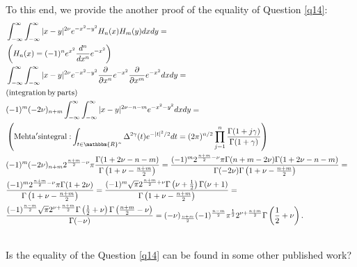 \documentclass{article}
\newcommand{\tmop}[1]{\ensuremath{\operatorname{#1}}}
\begin{document}
To this end, we provide the another proof of the equality of Question
\ref{q14}:
\begin{eqnarray}
  & \int_{- \infty}^{\infty} \int_{- \infty}^{\infty} | x - y |^{2 \nu} e^{-
  x^2 - y^2} H_n (x) H_m (y) d x d y = &  \nonumber\\
  & \left( H_n (x) = (- 1)^n e^{x^2} \frac{d^n}{d x^n} e^{- x^2} \right) & 
  \nonumber\\
  & \int_{- \infty}^{\infty} \int_{- \infty}^{\infty} | x - y |^{2 \nu} e^{-
  x^2 - y^2} \frac{\partial}{\partial x^n} e^{- x^2} \frac{\partial}{\partial
  x^m} e^{- x^2} d x d y = &  \nonumber\\
  & (\tmop{integration} \tmop{by} \tmop{parts}) &  \nonumber\\
  & (- 1)^m (- 2 \nu)_{n + m} \int_{- \infty}^{\infty} \int_{-
  \infty}^{\infty} | x - y |^{2 \nu - n - m} e^{- x^2 - y^2} d x d y = & 
  \nonumber\\
  & \left( \mathrm{Mehta's integral:} \int_{t \in \mathbbm{R}^n} \Delta^{2
  \gamma} (t) e^{- | t |^2 / 2} d t = (2 \pi)^{n / 2} \prod_{j = 1}^n
  \frac{\Gamma (1 + j \gamma)}{\Gamma (1 + \gamma)} \right) &  \nonumber\\
  & (- 1)^m (- 2 \nu)_{n + m} 2^{\frac{n + m}{2} - \nu} \pi \frac{\Gamma (1 +
  2 \nu - n - m)}{\Gamma \left( 1 + \nu - \frac{n + m}{2} \right)} = \frac{(-
  1)^m 2^{\frac{n + m}{2} - \nu} \pi \Gamma (n + m - 2 \nu) \Gamma (1 + 2 \nu
  - n - m)}{\Gamma (- 2 \nu) \Gamma \left( 1 + \nu - \frac{n + m}{2} \right)}
  = &  \nonumber\\
  & \frac{(- 1)^m 2^{\frac{n + m}{2} - \nu} \pi \Gamma (1 + 2 \nu)}{\Gamma
  \left( 1 + \nu - \frac{n + m}{2} \right)} = \frac{(- 1)^m \sqrt{\pi}
  2^{\frac{n + m}{2} + \nu} \Gamma \left( \nu + \frac{1}{2} \right) \Gamma
  (\nu + 1)}{\Gamma \left( 1 + \nu - \frac{n + m}{2} \right)} = &  \nonumber\\
  & \frac{(- 1)^{\frac{n - m}{2}} \sqrt{\pi} 2^{\nu + \frac{n + m}{2}} \Gamma
  \left( \frac{1}{2} + \nu \right) \Gamma \left( \frac{n + m}{2} - \nu
  \right)}{\Gamma (- \nu)} = (- \nu)_{\frac{n + m}{2}} (- 1)^{\frac{n - m}{2}}
  \pi^{\frac{1}{2}} 2^{\nu + \frac{n + m}{2}} \Gamma \left( \frac{1}{2} + \nu
  \right) . &  \nonumber\\
  &  &  \nonumber
\end{eqnarray}
\begin{question}
  Is the equality of the Question \ref{q14} can be found in some other
  published work?
\end{question}
\end{document}
